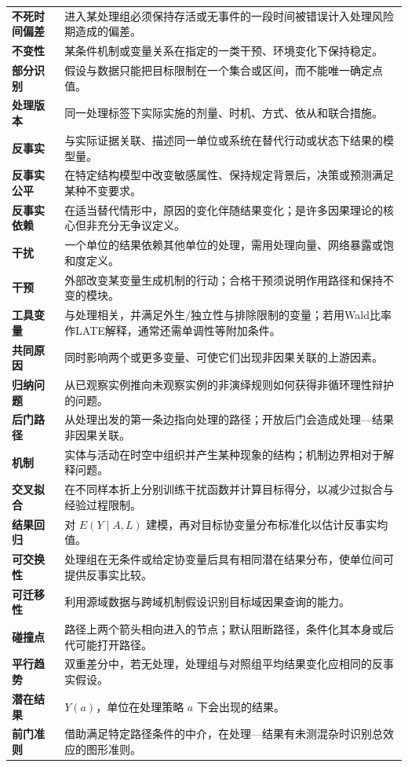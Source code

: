 \begin{longtable}{>{\bfseries}p{}p{}}
不死时间偏差 & 进入某处理组必须保持存活或无事件的一段时间被错误计入处理风险期造成的偏差。\\
不变性 & 某条件机制或变量关系在指定的一类干预、环境变化下保持稳定。\\
部分识别 & 假设与数据只能把目标限制在一个集合或区间，而不能唯一确定点值。\\
处理版本 & 同一处理标签下实际实施的剂量、时机、方式、依从和联合措施。\\
反事实 & 与实际证据关联、描述同一单位或系统在替代行动或状态下结果的模型量。\\
反事实公平 & 在特定结构模型中改变敏感属性、保持规定背景后，决策或预测满足某种不变要求。\\
反事实依赖 & 在适当替代情形中，原因的变化伴随结果变化；是许多因果理论的核心但非充分无争议定义。\\
干扰 & 一个单位的结果依赖其他单位的处理，需用处理向量、网络暴露或饱和度定义。\\
干预 & 外部改变某变量生成机制的行动；合格干预须说明作用路径和保持不变的模块。\\
工具变量 & 与处理相关，并满足外生/独立性与排除限制的变量；若用Wald比率作LATE解释，通常还需单调性等附加条件。\\
共同原因 & 同时影响两个或更多变量、可使它们出现非因果关联的上游因素。\\
归纳问题 & 从已观察实例推向未观察实例的非演绎规则如何获得非循环理性辩护的问题。\\
后门路径 & 从处理出发的第一条边指向处理的路径；开放后门会造成处理---结果非因果关联。\\
机制 & 实体与活动在时空中组织并产生某种现象的结构；机制边界相对于解释问题。\\
交叉拟合 & 在不同样本折上分别训练干扰函数并计算目标得分，以减少过拟合与经验过程限制。\\
结果回归 & 对 $E(Y\mid A,L)$ 建模，再对目标协变量分布标准化以估计反事实均值。\\
可交换性 & 处理组在无条件或给定协变量后具有相同潜在结果分布，使单位间可提供反事实比较。\\
可迁移性 & 利用源域数据与跨域机制假设识别目标域因果查询的能力。\\
碰撞点 & 路径上两个箭头相向进入的节点；默认阻断路径，条件化其本身或后代可能打开路径。\\
平行趋势 & 双重差分中，若无处理，处理组与对照组平均结果变化应相同的反事实假设。\\
潜在结果 & $Y(a)$，单位在处理策略 $a$ 下会出现的结果。\\
前门准则 & 借助满足特定路径条件的中介，在处理---结果有未测混杂时识别总效应的图形准则。\\

\end{longtable}

